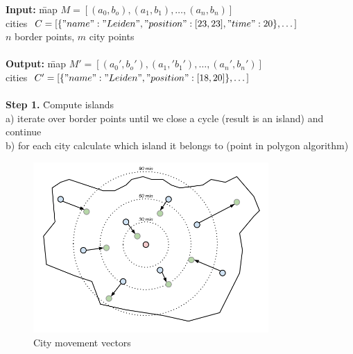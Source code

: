 \documentclass[a4paper,11pt]{article}
\newenvironment{boxedcode}
 {\setlength{\fboxsep}{1em}%
  \begin{lrbox}{\boxedcodebox}
  \begin{minipage}{\dimexpr\textwidth-2\fboxsep-2\fboxrule\relax}
  \begin{tabbing}}
 {\end{tabbing}
  \end{minipage}
  \end{lrbox}%
  \fbox{\usebox{\boxedcodebox}}}
\begin{document}
\begin{center}
\begin{boxedcode}
  \textbf{Input:}
  \= map $M=[(a_0,b_o),(a_1, b_1),\dots, (a_n, b_n)]$\\
  \> cities $C=[\{"name":"Leiden", "position": [23,23],
  "time":20\},\dots]$\\
  \> $n$ border points, $m$ city points\\
  \\
  \textbf{Output:}
  \= map $M'=[(a_0',b_o'),(a_1,' b_1'),\dots, (a_n', b_n')]$\\
  \> cities $C'=[\{"name":"Leiden", "position": [18,20]\},\dots]$\\
  \\
  \textbf{Step 1.} \= Compute islands\\
  \> a) iterate over border points until we close a cycle (result is
  an island) and continue\\
  \> b) for each city calculate which island it belongs to (point in
  polygon algorithm)\\
\end{boxedcode}

\label{alg}
\end{center}


\begin{figure}[h!]
  \centering
  \includegraphics[width=0.8\textwidth]{forces.png}
  \caption{City movement vectors}
  \label{forces}
\end{figure}
\end{document}
